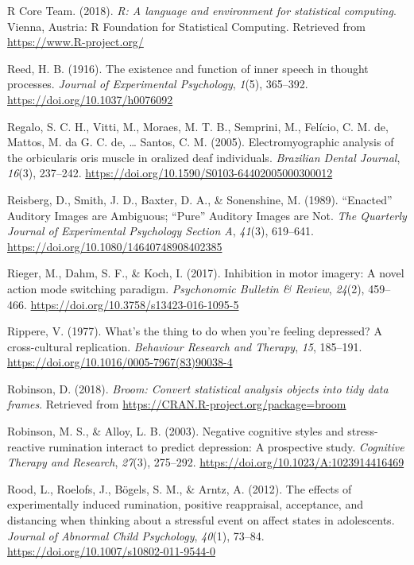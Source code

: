 \documentclass[a4paper,12pt,twoside,openright,oldfontcommands]{memoir}
\begin{document}
\leavevmode\hypertarget{ref-R-base}{}%
R Core Team. (2018). \emph{R: A language and environment for statistical computing}. Vienna, Austria: R Foundation for Statistical Computing. Retrieved from \url{https://www.R-project.org/}

\leavevmode\hypertarget{ref-reed_existence_1916}{}%
Reed, H. B. (1916). The existence and function of inner speech in thought processes. \emph{Journal of Experimental Psychology}, \emph{1}(5), 365--392. \url{https://doi.org/10.1037/h0076092}

\leavevmode\hypertarget{ref-regalo_electromyographic_2005}{}%
Regalo, S. C. H., Vitti, M., Moraes, M. T. B., Semprini, M., Felício, C. M. de, Mattos, M. da G. C. de, \ldots{} Santos, C. M. (2005). Electromyographic analysis of the orbicularis oris muscle in oralized deaf individuals. \emph{Brazilian Dental Journal}, \emph{16}(3), 237--242. \url{https://doi.org/10.1590/S0103-64402005000300012}

\leavevmode\hypertarget{ref-reisberg_enacted_1989}{}%
Reisberg, D., Smith, J. D., Baxter, D. A., \& Sonenshine, M. (1989). ``Enacted'' Auditory Images are Ambiguous; ``Pure'' Auditory Images are Not. \emph{The Quarterly Journal of Experimental Psychology Section A}, \emph{41}(3), 619--641. \url{https://doi.org/10.1080/14640748908402385}

\leavevmode\hypertarget{ref-rieger_inhibition_2017}{}%
Rieger, M., Dahm, S. F., \& Koch, I. (2017). Inhibition in motor imagery: A novel action mode switching paradigm. \emph{Psychonomic Bulletin \& Review}, \emph{24}(2), 459--466. \url{https://doi.org/10.3758/s13423-016-1095-5}

\leavevmode\hypertarget{ref-Rippere1977}{}%
Rippere, V. (1977). What's the thing to do when you're feeling depressed? A cross-cultural replication. \emph{Behaviour Research and Therapy}, \emph{15}, 185--191. \url{https://doi.org/10.1016/0005-7967(83)90038-4}

\leavevmode\hypertarget{ref-R-broom}{}%
Robinson, D. (2018). \emph{Broom: Convert statistical analysis objects into tidy data frames}. Retrieved from \url{https://CRAN.R-project.org/package=broom}

\leavevmode\hypertarget{ref-Robinson2003}{}%
Robinson, M. S., \& Alloy, L. B. (2003). Negative cognitive styles and stress-reactive rumination interact to predict depression: A prospective study. \emph{Cognitive Therapy and Research}, \emph{27}(3), 275--292. \url{https://doi.org/10.1023/A:1023914416469}

\leavevmode\hypertarget{ref-Rood2012}{}%
Rood, L., Roelofs, J., Bögels, S. M., \& Arntz, A. (2012). The effects of experimentally induced rumination, positive reappraisal, acceptance, and distancing when thinking about a stressful event on affect states in adolescents. \emph{Journal of Abnormal Child Psychology}, \emph{40}(1), 73--84. \url{https://doi.org/10.1007/s10802-011-9544-0}
\end{document}
